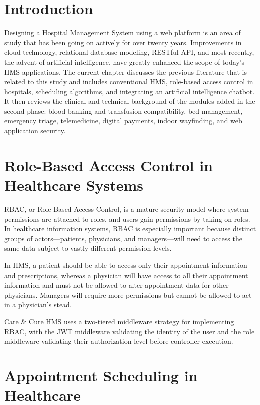 \FloatBarrier
\section{Introduction}

Designing a Hospital Management System using a web platform is an area of study that has been going on actively for over twenty years. Improvements in cloud technology, relational database modeling, RESTful API, and most recently, the advent of artificial intelligence, have greatly enhanced the scope of today's HMS applications. The current chapter discusses the previous literature that is related to this study and includes conventional HMS, role-based access control in hospitals, scheduling algorithms, and integrating an artificial intelligence chatbot. It then reviews the clinical and technical background of the modules added in the second phase: blood banking and transfusion compatibility, bed management, emergency triage, telemedicine, digital payments, indoor wayfinding, and web application security.

\FloatBarrier


\FloatBarrier
\section{Role-Based Access Control in Healthcare Systems}

RBAC, or Role-Based Access Control, is a mature security model where system permissions are attached to roles, and users gain permissions by taking on roles. In healthcare information systems, RBAC is especially important because distinct groups of actors—patients, physicians, and managers—will need to access the same data subject to vastly different permission levels.

In HMS, a patient should be able to access only their appointment information and prescriptions, whereas a physician will have access to all their appointment information and must not be allowed to alter appointment data for other physicians. Managers will require more permissions but cannot be allowed to act in a physician's stead.

Care \& Cure HMS uses a two-tiered middleware strategy for implementing RBAC, with the JWT middleware validating the identity of the user and the role middleware validating their authorization level before controller execution.

\FloatBarrier
\section{Appointment Scheduling in Healthcare}

